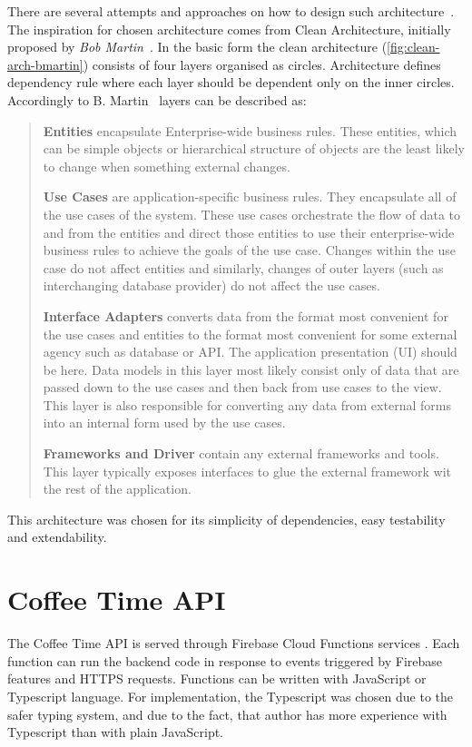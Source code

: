 There are several attempts and approaches on how to design such architecture~\cite{clean-architecture-article}. The inspiration for chosen architecture comes from Clean Architecture, initially proposed by \textit{Bob Martin}~\cite{clean-architecture-book}. In the basic form the clean architecture (\cref{fig:clean-arch-bmartin}) consists of four layers organised as circles. Architecture defines dependency rule where each layer should be dependent only on the inner circles. Accordingly to B. Martin~\cite{clean-architecture-article} layers can be described as:  

\begin{quote}
\textbf{Entities} encapsulate Enterprise-wide business rules. These entities, which can be simple objects or hierarchical structure of objects are the least likely to change when something external changes.

\textbf{Use Cases} are application-specific business rules. They encapsulate all of the use cases of the system. These use cases orchestrate the flow of data to and from the entities and direct those entities to use their enterprise-wide business rules to achieve the goals of the use case. Changes within the use case do not affect entities and similarly, changes of outer layers (such as interchanging database provider) do not affect the use cases. 

\textbf{Interface Adapters} converts data from the format most convenient for the use cases and entities to the format most convenient for some external agency such as database or API.  The application presentation (UI) should be here. Data models in this layer most likely consist only of data that are passed down to the use cases and then back from use cases to the view.  This layer is also responsible for converting any data from external forms into an internal form used by the use cases.

\textbf{Frameworks and Driver} contain any external frameworks and tools. This layer typically exposes interfaces to glue the external framework wit the rest of the application. 
\end{quote}

This architecture was chosen for its simplicity of dependencies, easy testability and extendability. 
\section{Coffee Time API}
The Coffee Time API is served through Firebase Cloud Functions services . Each function can run the backend code in response to events triggered by Firebase features and HTTPS requests. Functions can be written with JavaScript or Typescript language. For implementation, the Typescript was chosen due to the safer typing system, and due to the fact, that author has more experience with Typescript than with plain JavaScript. 

